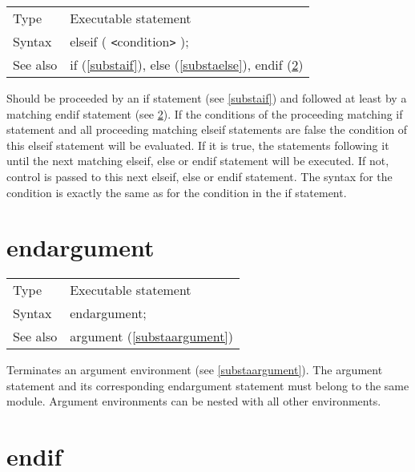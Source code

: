 \noindent \begin{tabular}{ll}
Type & Executable statement\\
Syntax & elseif ( {\tt<}condition{\tt>} );
\\ See also & if (\ref{substaif}),
              else (\ref{substaelse}),
              endif (\ref{substaendif})
\end{tabular} \vspace{4mm}

\noindent Should be proceeded by an if 
statement (see \ref{substaif}) and followed at least by a matching 
endif 
statement (see \ref{substaendif}). If the conditions of the proceeding 
matching if statement and all proceeding matching
elseif statements are false the 
condition of this elseif statement will be evaluated. If it is true, the 
statements following it until the next matching elseif,
else or endif statement will be executed. 
If not, control is passed to this next elseif, else or endif statement. The 
syntax for the condition is exactly the same as for the condition in the if 
statement. \vspace{10mm}
 

\section{endargument}
\label{substaendargument}

\noindent \begin{tabular}{ll}
Type & Executable statement\\
Syntax & endargument; \\
See also & argument (\ref{substaargument})
\end{tabular} \vspace{4mm}

\noindent Terminates an argument environment 
(see \ref{substaargument}). The argument statement and its 
corresponding endargument statement must belong to the 
same module. Argument environments can be nested with all other 
environments. \vspace{10mm}


\section{endif}
\label{substaendif}

